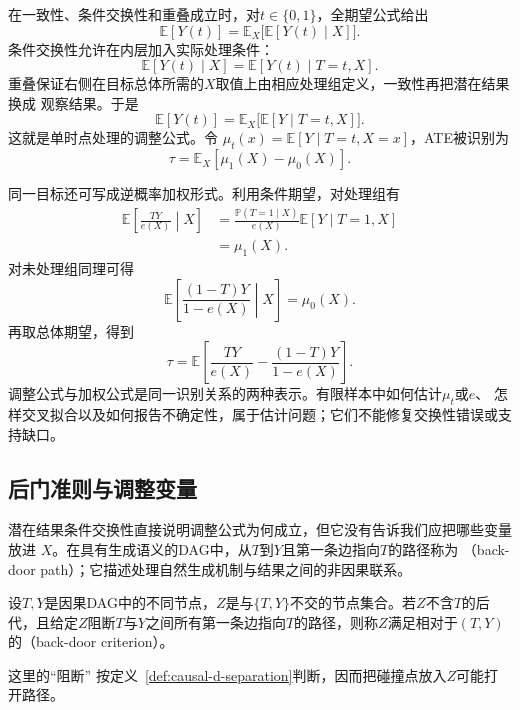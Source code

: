 在一致性、条件交换性和重叠成立时，对\(t\in\{0,1\}\)，全期望公式给出
\[
  \mathbb{E}[Y(t)]
  =
  \mathbb{E}_X\bigl[
    \mathbb{E}[Y(t)\mid X]
  \bigr].
\]
条件交换性允许在内层加入实际处理条件：
\[
  \mathbb{E}[Y(t)\mid X]
  =
  \mathbb{E}[Y(t)\mid T=t,X].
\]
重叠保证右侧在目标总体所需的\(X\)取值上由相应处理组定义，一致性再把潜在结果换成
观察结果。于是
\begin{equation}
  \mathbb{E}[Y(t)]
  =
  \mathbb{E}_X\bigl[
    \mathbb{E}[Y\mid T=t,X]
  \bigr].
  \label{eq:causal-g-formula}
\end{equation}
这就是单时点处理的调整公式。令
\(\mu_t(x)=\mathbb{E}[Y\mid T=t,X=x]\)，ATE被识别为
\begin{equation}
  \tau
  =
  \mathbb{E}_X[\mu_1(X)-\mu_0(X)].
  \label{eq:causal-ate-adjustment}
\end{equation}

同一目标还可写成逆概率加权形式。利用条件期望，对处理组有
\[
\begin{aligned}
  \mathbb{E}\left[\frac{TY}{e(X)}\middle|X\right]
  &=
  \frac{\mathbb{P}(T=1\mid X)}{e(X)}
  \mathbb{E}[Y\mid T=1,X]\\
  &=\mu_1(X).
\end{aligned}
\]
对未处理组同理可得
\[
  \mathbb{E}\left[
    \frac{(1-T)Y}{1-e(X)}
    \middle|X
  \right]
  =\mu_0(X).
\]
再取总体期望，得到
\begin{equation}
  \tau
  =
  \mathbb{E}\left[
    \frac{TY}{e(X)}
    -
    \frac{(1-T)Y}{1-e(X)}
  \right].
  \label{eq:causal-ipw-identification}
\end{equation}
调整公式与加权公式是同一识别关系的两种表示。有限样本中如何估计\(\mu_t\)或\(e\)、
怎样交叉拟合以及如何报告不确定性，属于估计问题；它们不能修复交换性错误或支持缺口。

\subsection{后门准则与调整变量}

潜在结果条件交换性直接说明调整公式为何成立，但它没有告诉我们应把哪些变量放进
\(X\)。在具有生成语义的DAG中，从\(T\)到\(Y\)且第一条边指向\(T\)的路径称为
（back-door path）；它描述处理自然生成机制与结果之间的非因果联系。
\begin{definition}
  \label{def:causal-backdoor-criterion}
  设\(T,Y\)是因果DAG中的不同节点，\(Z\)是与\(\{T,Y\}\)不交的节点集合。若\(Z\)不含\(T\)的后代，且给定\(Z\)阻断\(T\)与\(Y\)之间所有第一条边指向\(T\)的路径，则称\(Z\)满足相对于\((T,Y)\)的（back-door criterion）。
\end{definition}
这里的“阻断”
按定义~\ref{def:causal-d-separation}判断，因而把碰撞点放入\(Z\)可能打开路径。

